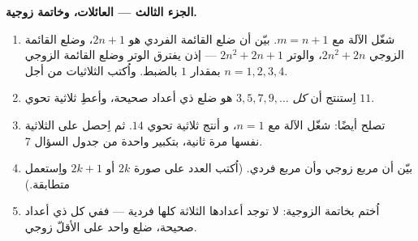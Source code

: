 \begin{problem}[{مسألة نهاية الأسبوع --- المثلثات القائمة الزاوية ذات الأعداد
الصحيحة، والمتطابقة $(m^2 - n^2)^2 + (2mn)^2 = (m^2 + n^2)^2$ التي
تولّدها كلها}]
\medskip
\noindent\textbf{الجزء الثالث --- العائلات، وخاتمة زوجية.}
\begin{enumerate}[resume]
  \item شغّل الآلة مع $m = n + 1$. بيّن أن ضلع القائمة الفردي
        هو $2n + 1$، وضلع القائمة الزوجي $2n^2 + 2n$، والوتر
        $2n^2 + 2n + 1$ --- إذن يفترق الوتر وضلع القائمة الزوجي بمقدار
        $1$ بالضبط. واُكتب الثلاثيات من أجل $n = 1, 2, 3, 4$.
  \item اِستنتج أن \emph{كل}  $3, 5, 7, 9, \dots$
        هو ضلع  ذي أعداد صحيحة، وأعطِ
        ثلاثية تحوي $11$.
  \item {} تصلح أيضًا: شغّل الآلة مع $n = 1$، و
        أنتج ثلاثية تحوي $14$. ثم اِحصل على الثلاثية
        نفسها مرة ثانية، بتكبير واحدة من جدول
        السؤال 7.
  \item بيّن أن مربع  زوجي وأن
        مربع  فردي. (اُكتب العدد على صورة
        $2k$ أو $2k + 1$ واِستعمل متطابقة.)
  \item اُختم بخاتمة الزوجية: لا توجد 
        أعدادها الثلاثة كلها فردية --- ففي كل 
        ذي أعداد صحيحة، ضلع واحد على الأقلّ زوجي.
\end{enumerate}
\end{problem}
